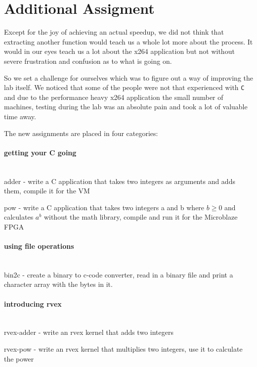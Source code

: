 \section{Additional Assigment}
Except for the joy of achieving an actual speedup, we did not think that extracting another function would teach us a whole lot more about the process.
It would in our eyes teach us a lot about the x264 application but not without severe frustration and confusion as to what is going on.

So we set a challenge for ourselves which was to figure out a way of improving the lab itself.
We noticed that some of the people were not that experienced with \texttt{C} and due to the performance heavy x264 application the small number of \rvex{} machines, testing during the lab was an absolute pain and took a lot of valuable time away.

The new assignments are placed in four categories:

\paragraph{getting your C going} \hfill \\
adder - write a C application that takes two integers as arguments and adds them, compile it for the VM

pow - write a C application that takes two integers a and b where $b \ge 0$ and calculates $a^b$ without the math library, compile and run it for the Microblaze FPGA

\paragraph{using file operations} \hfill \\
bin2c - create a binary to c-code converter, read in a binary file and print a character array with the bytes in it.

\paragraph{introducing rvex} \hfill \\
rvex-adder - write an rvex kernel that adds two integers

rvex-pow - write an rvex kernel that multiplies two integers, use it to calculate the power

